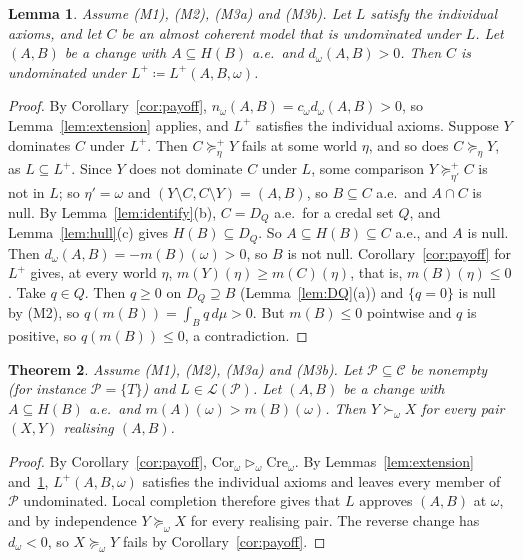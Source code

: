 \documentclass[11pt]{article}
\newtheorem{theorem}{Theorem}[section]
\newtheorem{lemma}[theorem]{Lemma}
\theoremstyle{definition}
\newcommand{\C}{\mathcal C}
\newcommand{\Lc}{\mathcal L}
\newcommand{\Pc}{\mathcal P}
\newcommand{\Cor}{\mathrm{Cor}}
\newcommand{\Cre}{\mathrm{Cre}}
\newcommand{\sgt}{\triangleright}
\begin{document}
\begin{lemma}\label{lem:hullharm}
Assume (M1), (M2), (M3a) and (M3b). Let $L$ satisfy the individual axioms, and let $C$ be an almost coherent model that is undominated under $L$. Let $(A,B)$ be a change with $A\subseteq H(B)$ a.e.\ and $d_\omega(A,B)>0$. Then $C$ is undominated under $L^+\coloneqq L^+(A,B,\omega)$.
\end{lemma}
\begin{proof}
By Corollary~\ref{cor:payoff}, $n_\omega(A,B)=c_\omega d_\omega(A,B)>0$, so Lemma~\ref{lem:extension} applies, and $L^+$ satisfies the individual axioms. Suppose $Y$ dominates $C$ under $L^+$. Then $C\succeq^+_\eta Y$ fails at some world $\eta$, and so does $C\succeq_\eta Y$, as $L\subseteq L^+$. Since $Y$ does not dominate $C$ under $L$, some comparison $Y\succeq^+_{\eta'}C$ is not in $L$; so $\eta'=\omega$ and $(Y\setminus C,C\setminus Y)=(A,B)$, so $B\subseteq C$ a.e.\ and $A\cap C$ is null. By Lemma~\ref{lem:identify}(b), $C=D_Q$ a.e.\ for a credal set $Q$, and Lemma~\ref{lem:hull}(c) gives $H(B)\subseteq D_Q$. So $A\subseteq H(B)\subseteq C$ a.e., and $A$ is null. Then $d_\omega(A,B)=-m(B)(\omega)>0$, so $B$ is not null. Corollary~\ref{cor:payoff} for $L^+$ gives, at every world $\eta$, $m(Y)(\eta)\ge m(C)(\eta)$, that is, $m(B)(\eta)\le0$. Take $q\in Q$. Then $q\ge0$ on $D_Q\supseteq B$ (Lemma~\ref{lem:DQ}(a)) and $\{q=0\}$ is null by (M2), so $q(m(B))=\int_Bq\,d\mu>0$. But $m(B)\le0$ pointwise and $q$ is positive, so $q(m(B))\le0$, a contradiction.
\end{proof}

\begin{theorem}\label{thm:strict}
Assume (M1), (M2), (M3a) and (M3b). Let $\Pc\subseteq\C$ be nonempty (for instance $\Pc=\{T\}$) and $L\in\Lc(\Pc)$. Let $(A,B)$ be a change with $A\subseteq H(B)$ a.e.\ and $m(A)(\omega)>m(B)(\omega)$. Then $Y\succ_\omega X$ for every pair $(X,Y)$ realising $(A,B)$.
\end{theorem}
\begin{proof}
By Corollary~\ref{cor:payoff}, $\Cor_\omega\sgt_\omega\Cre_\omega$. By Lemmas~\ref{lem:extension} and~\ref{lem:hullharm}, $L^+(A,B,\omega)$ satisfies the individual axioms and leaves every member of $\Pc$ undominated. Local completion therefore gives that $L$ approves $(A,B)$ at $\omega$, and by independence $Y\succeq_\omega X$ for every realising pair. The reverse change has $d_\omega<0$, so $X\succeq_\omega Y$ fails by Corollary~\ref{cor:payoff}.
\end{proof}
\end{document}

